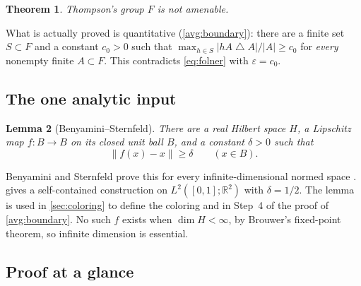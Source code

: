 \documentclass[11pt]{article}
\newcommand{\R}{\mathbb R}
\newcommand{\norm}[1]{\lVert #1\rVert}
\newtheorem{theorem}{Theorem}[section]
\newtheorem{lemma}[theorem]{Lemma}
\theoremstyle{definition}
\numberwithin{equation}{section}
\begin{document}
\begin{theorem}\label{thm:main}
Thompson's group \(F\) is not amenable.
\end{theorem}

What is actually proved is quantitative (\cref{avg:boundary}): there are a
finite set \(S\subset F\) and a constant \(c_0>0\) such that
\(\max_{h\in S}|hA\mathbin{\triangle}A|/|A|\ge c_0\) for \emph{every}
nonempty finite \(A\subset F\). This contradicts \eqref{eq:folner} with
\(\varepsilon=c_0\).

\subsection{The one analytic input}

\begin{lemma}[Benyamini--Sternfeld]\label{lem:displacement}
There are a real Hilbert space \(H\), a Lipschitz map \(f:B\to B\) on its
closed unit ball \(B\), and a constant \(\delta>0\) such that
\[
  \norm{f(x)-x}\ge\delta\qquad(x\in B).
\]
\end{lemma}

Benyamini and Sternfeld prove this for every infinite-dimensional normed
space \cite[Theorem, part~(3), p.~439]{BenyaminiSternfeld1983}.
 gives a self-contained construction on
\(L^2([0,1];\R^2)\) with \(\delta=1/2\). The lemma is used in
\cref{sec:coloring} to define the coloring and in Step~4 of the proof of
\cref{avg:boundary}. No such \(f\) exists when \(\dim H<\infty\), by
Brouwer's fixed-point theorem, so infinite dimension is essential.

\subsection{Proof at a glance}\label{sec:glance}
\end{document}
